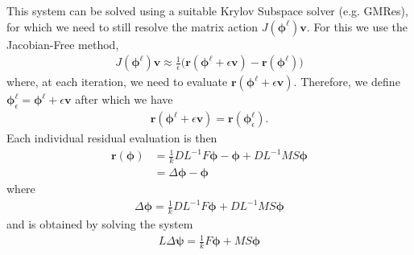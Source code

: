 \documentclass[11pt,letterpaper,notitlepage]{article}
\newcommand{\beqn}{\begin{equation}
		\begin{aligned}}
\newcommand{\eeqn}{\end{aligned}
\end{equation}}
\numberwithin{equation}{section}
\newcommand{\Linv}{L^{-1}}
\newcommand{\bphi}{\boldsymbol{\phi}}
\newcommand{\bpsi}{\boldsymbol{\psi}}
\newcommand{\br}{\mathbf{r}}
\begin{document}
This system can be solved using a suitable Krylov Subspace solver (e.g. GMRes), for which we need to still resolve the matrix action $J(\bphi^{\ell})\mathbf{v}$. For this we use the Jacobian-Free method,
\beqn 
J(\bphi^{\ell})\mathbf{v} \approx \frac{1}{\epsilon} \biggr(\br(\bphi^\ell + \epsilon \mathbf{v}) - \br(\bphi^\ell)\biggr)
\eeqn 
where, at each iteration, we need to evaluate $\br(\bphi^\ell + \epsilon \mathbf{v})$. Therefore, we define $\bphi_\epsilon^\ell = \bphi^\ell + \epsilon \mathbf{v}$ after which we have
\beqn 
\br(\bphi^\ell + \epsilon \mathbf{v}) = \br(\bphi_\epsilon^\ell).
\eeqn 
Each individual residual evaluation is then 
\beqn 
\br(\bphi) 
&= \frac{1}{k} D\Linv F \bphi - \bphi + D\Linv MS \bphi \\
&= \Delta \bphi - \bphi
\eeqn 
where
\beqn 
\Delta \bphi = \frac{1}{k} D\Linv F \bphi + D\Linv MS \bphi
\eeqn 
and is obtained by solving the system
\beqn 
L \Delta \bpsi  =  \frac{1}{k} F \bphi + MS \bphi
\eeqn 
\end{document}
